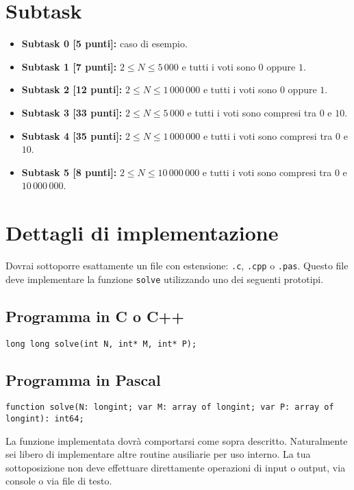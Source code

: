\documentclass[a4paper,11pt]{article}
\begin{document}
\section*{Subtask}
\begin{itemize}
\item \textbf{Subtask 0 \phantom{1}[5 punti]:} caso di esempio.
\item \textbf{Subtask 1 \phantom{1}[7 punti]:} $2 \le N \le 5\,000$ e tutti i voti sono $0$ oppure $1$.
\item \textbf{Subtask 2 [12 punti]:} $2 \le N\le 1\,000\,000$ e tutti i voti sono $0$ oppure $1$.
\item \textbf{Subtask 3 [33 punti]:} $2 \le N \le 5\,000$ e tutti i voti sono compresi tra $0$ e $10$.
\item \textbf{Subtask 4 [35 punti]:} $2 \le N \le 1\,000\,000$ e tutti i voti sono compresi tra $0$ e $10$.
\item \textbf{Subtask 5 \phantom{1}[8 punti]:} $2 \le N \le 10\,000\,000$ e tutti i voti sono compresi tra 0 e $10\,000\,000$.
\end{itemize}


\section*{Dettagli di implementazione}
Dovrai sottoporre esattamente un file con estensione: \texttt{.c},
\texttt{.cpp} o \texttt{.pas}. Questo file deve implementare la
funzione \texttt{solve} utilizzando uno dei seguenti
prototipi.

\subsection*{Programma in C o C++}
\begin{verbatim}
long long solve(int N, int* M, int* P);
\end{verbatim}

\subsection*{Programma in Pascal}
\begin{verbatim}
function solve(N: longint; var M: array of longint; var P: array of longint): int64;
\end{verbatim}

La funzione implementata dovrà comportarsi come sopra
descritto. Naturalmente sei libero di implementare altre routine
ausiliarie per uso interno. La tua sottoposizione non deve effettuare
direttamente operazioni di input o output, via console o via file di
testo.
\end{document}
